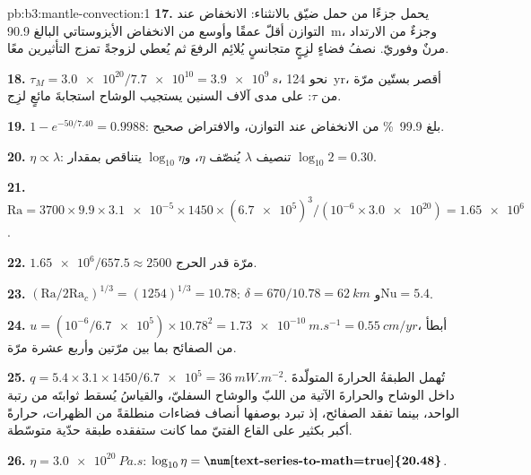 \begin{solution}{pb:b3:mantle-convection:1}
\textbf{17.} يحمل جزءًا من حمل ضيّق بالانثناء: الانخفاض عند
التوازن أقلّ عمقًا وأوسع من الانخفاض الأيزوستاتي البالغ \qty{90.9}{m}، وجزءٌ
من الارتداد مرنٌ وفوريّ. نصفُ فضاءٍ لزِجٍ متجانسٍ يُلائِم الرفعَ
ثم يُعطي لزوجةً تمزج التأثيرين معًا.

\textbf{18.} $\tau_M = \num{3.0e20}/\num{7.7e10} = \qty{3.9e9}{s}$، نحو
\qty{124}{yr}، أقصر بستّين مرّة من $\tau$: على مدى آلاف السنين يستجيب
الوشاح استجابةَ مائعٍ لزِج.

\textbf{19.} $1 - e^{-50/7.40} = 0.9988$: بلغ \qty{99.9}{\percent} من
الانخفاض عند التوازن، والافتراض صحيح.

\textbf{20.} $\eta \propto \lambda$: تنصيف $\lambda$ يُنصّف $\eta$،
و$\log_{10}\eta$ يتناقص بمقدار $\log_{10}2 = 0.30$.

\textbf{21.} $\mathrm{Ra} = 3700\times9.9\times\num{3.1e-5}\times1450\times
(\num{6.7e5})^3/(10^{-6}\times\num{3.0e20}) = \num{1.65e6}$.

\textbf{22.} $\num{1.65e6}/657.5 \approx 2500$ مرّة قدر الحرج.

\textbf{23.} $(\mathrm{Ra}/2\mathrm{Ra}_c)^{1/3} = (1254)^{1/3} = 10.78$: $\delta
= 670/10.78 = \qty{62}{km}$ و$\mathrm{Nu} = 5.4$.

\textbf{24.} $u = (10^{-6}/\num{6.7e5})\times10.78^2 = \qty{1.73e-10}{m.s^{-1}}
= \qty{0.55}{cm/yr}$، أبطأ من الصفائح بما بين مرّتين وأربع عشرة مرّة.

\textbf{25.} $q = 5.4\times3.1\times1450/\num{6.7e5} = \qty{36}{mW.m^{-2}}$. تُهمل
الطبقةُ الحرارةَ المتولّدةَ داخل الوشاح والحرارةَ الآتية من اللبّ والوشاح السفليّ،
والقياسُ يُسقط ثوابتَه من رتبة الواحد،
بينما تفقد الصفائح، إذ تبرد بوصفها أنصاف فضاءات منطلقةً من الظهرات، حرارةً أكبر بكثير على القاع الفتيّ
مما كانت ستفقده طبقة حدّية متوسّطة.

\textbf{26.} $\eta = \qty{3.0e20}{Pa.s}$: $\log_{10}\eta =
\textbf{\num[text-series-to-math=true]{20.48}}$.
\end{solution}

